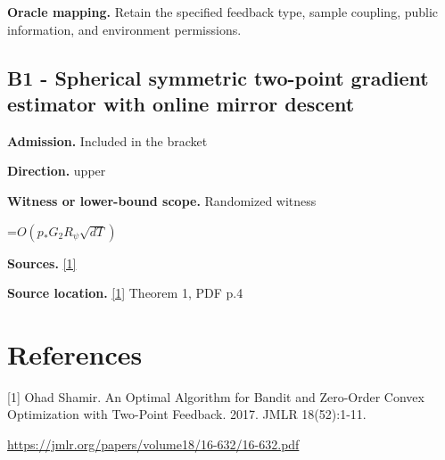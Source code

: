 \documentclass[10pt,a4paper]{article}
\newcommand{\AtlasMath}[1]{\par\begingroup\centering\setbox0=\hbox{$\displaystyle #1$}\ifdim\wd0>1.4\linewidth\typeout{ATLAS WIDE FORMULA: \the\wd0}\fi\ifdim\wd0>\linewidth\resizebox{\linewidth}{!}{\box0}\else\box0\fi\par\endgroup}
\begin{document}
\textbf{Oracle mapping.} Retain the specified feedback type, sample coupling, public information, and environment permissions.

\subsection{B1 - Spherical symmetric two-point gradient estimator with online mirror descent}
\textbf{Admission.} Included in the bracket

\textbf{Direction.} upper

\textbf{Witness or lower-bound scope.} Randomized witness

\AtlasMath{O\!\left(p_*G_2R_\psi\sqrt{dT}\right)}
\textbf{Sources.} \href{https://jmlr.org/papers/volume18/16-632/16-632.pdf}{[1]}

\textbf{Source location.} \href{https://jmlr.org/papers/volume18/16-632/16-632.pdf}{[1]} Theorem 1, PDF p.4

\section{References}
[1] Ohad Shamir. An Optimal Algorithm for Bandit and Zero-Order Convex Optimization with Two-Point Feedback. 2017. JMLR 18(52):1-11.

\url{https://jmlr.org/papers/volume18/16-632/16-632.pdf}
\end{document}
